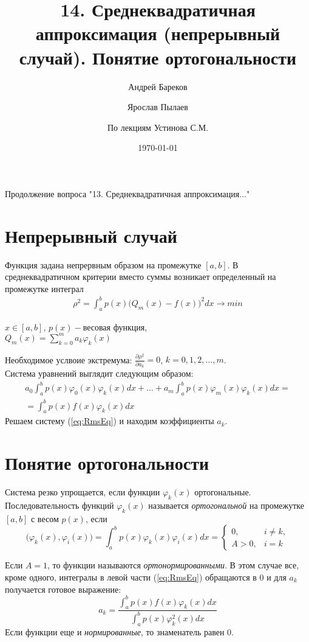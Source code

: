 \documentclass[a4paper,11pt]{article}
\title{14. Среднеквадратичная аппроксимация (непрерывный случай). Понятие ортогональности}
\author{Андрей Бареков \and Ярослав Пылаев \and По лекциям Устинова С.М.}
\date{\today}
\begin{document}
\maketitle
\newpage

Продолжение вопроса "13. Среднеквадратичная аппроксимация..."
\section{Непрерывный случай}
Функция задана непрервным образом на промежутке $[a,b]$.
В среднеквадратичном критерии вместо суммы возникает определенный на промежутке интеграл
\begin{gather*}
  \rho^2 = \int_a^b p(x)\bigg( Q_m(x)-f(x) \bigg)^2 dx \rightarrow min
\end{gather*}
\begin{flushright}
  \small
  $x\in [a,b]$, $p(x) - \text{весовая функция}$, \\
  $Q_m(x) = \sum_{k=0}^m a_k\varphi_k(x)$
\end{flushright}
Необходимое услвоие экстремума: $\frac{\partial \rho^2}{\partial a_k} = 0$, $k=0,1,2,\dots,m$. \\
Система уравнений выглядит следующим образом: \\
\begin{equation}
  \begin{split}
    a_0\int_a^b p(x)\varphi_0(x)\varphi_k(x)dx +\dots+ a_m\int_a^b p(x)\varphi_m(x)\varphi_k(x)dx = \\
    = \int_a^b p(x)f(x)\varphi_k(x)dx
  \end{split}
  \label{eq:RmsEq}
\end{equation}
Решаем систему (\ref{eq:RmsEq}) и находим коэффициенты $a_k$. \\

\section{Понятие ортогональности}
Система резко упрощается, если функции ${\varphi_k(x)}$ ортогональные.
Последовательность функций ${\varphi_k(x)}$ называется \textit{ортогональной} на промежутке $[a,b]$ с весом $p(x)$, если
\begin{equation}
 \bigg(\varphi_k(x), \varphi_i(x)\bigg) = \int_a^b p(x)\varphi_k(x)\varphi_i(x)dx =
 \begin{cases}
   0, & i \ne k, \\
   A>0, & i=k
 \end{cases}
\end{equation}

Если $A=1$, то функции называются \textit{ортонормированными}. В этом случае все, кроме одного, интегралы в левой части
(\ref{eq:RmsEq}) обращаются в 0 и для $a_k$ получается готовое выражение:
\begin{equation*}
  a_k = \frac{\int_a^b p(x)f(x)\varphi_k(x)dx}{\int_a^b p(x)\varphi_k^2(x)dx}
\end{equation*}
Если функции еще и \textit{нормированные}, то знаменатель равен 0.
\end{document}
